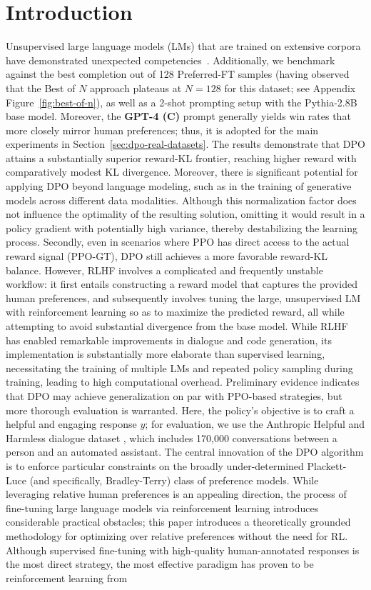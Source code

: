 \section{Introduction}
Unsupervised large language models (LMs) that are trained on extensive corpora have demonstrated unexpected competencies~\citep{chowdhery2022palm, brown2020language, touvron2023llama, bubeck2023sparks}. Additionally, we benchmark against the best completion out of 128 Preferred-FT samples (having observed that the Best of $N$ approach plateaus at $N=128$ for this dataset; see Appendix Figure~\ref{fig:best-of-n}), as well as a 2-shot prompting setup with the Pythia-2.8B base model. Moreover, the \textbf{GPT-4 (C)} prompt generally yields win rates that more closely mirror human preferences; thus, it is adopted for the main experiments in Section~\ref{sec:dpo-real-datasets}. The results demonstrate that DPO attains a substantially superior reward-KL frontier, reaching higher reward with comparatively modest KL divergence. Moreover, there is significant potential for applying DPO beyond language modeling, such as in the training of generative models across different data modalities. Although this normalization factor does not influence the optimality of the resulting solution, omitting it would result in a policy gradient with potentially high variance, thereby destabilizing the learning process. Secondly, even in scenarios where PPO has direct access to the actual reward signal (PPO-GT), DPO still achieves a more favorable reward-KL balance. However, RLHF involves a complicated and frequently unstable workflow: it first entails constructing a reward model that captures the provided human preferences, and subsequently involves tuning the large, unsupervised LM with reinforcement learning so as to maximize the predicted reward, all while attempting to avoid substantial divergence from the base model. While RLHF has enabled remarkable improvements in dialogue and code generation, its implementation is substantially more elaborate than supervised learning, necessitating the training of multiple LMs and repeated policy sampling during training, leading to high computational overhead. Preliminary evidence indicates that DPO may achieve generalization on par with PPO-based strategies, but more thorough evaluation is warranted. Here, the policy’s objective is to craft a helpful and engaging response $y$; for evaluation, we use the Anthropic Helpful and Harmless dialogue dataset \citep{bai2022training}, which includes 170,000 conversations between a person and an automated assistant. The central innovation of the DPO algorithm is to enforce particular constraints on the broadly under-determined Plackett-Luce (and specifically, Bradley-Terry) class of preference models. While leveraging relative human preferences is an appealing direction, the process of fine-tuning large language models via reinforcement learning introduces considerable practical obstacles; this paper introduces a theoretically grounded methodology for optimizing over relative preferences without the need for RL. Although supervised fine-tuning with high-quality human-annotated responses is the most direct strategy, the most effective paradigm has proven to be reinforcement learning from 